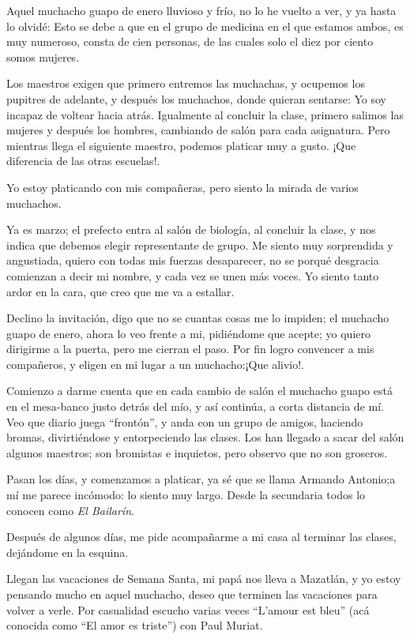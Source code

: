 \documentclass[letterpaper, 12pt]{book}
\begin{document}
Aquel muchacho guapo de enero lluvioso y frío, no lo he vuelto a ver, y ya hasta lo olvidé: Esto se debe a que en el grupo de medicina en el que estamos ambos, es muy numeroso, consta de cien personas, de las cuales solo el diez por ciento somos mujeres.

Los maestros exigen que primero entremos las muchachas, y ocupemos los pupitres de adelante, y después los muchachos, donde quieran sentarse: Yo soy incapaz de voltear hacia atrás. Igualmente al concluir la clase, primero salimos las mujeres y después los hombres, cambiando de salón para cada asignatura. Pero mientras llega el siguiente maestro, podemos platicar muy a gusto. ¡Que diferencia de las otras escuelas!. 

Yo estoy platicando con mis compañeras, pero siento la mirada de varios muchachos.

Ya es marzo; el prefecto entra al salón de biología, al concluir la clase, y nos indica que debemos elegir representante de grupo. Me siento muy sorprendida y angustiada, quiero con todas mis fuerzas desaparecer, no se porqué desgracia comienzan a decir mi nombre, y cada vez se unen más voces. Yo siento tanto ardor en la cara, que creo que me va a estallar.

Declino la invitación, digo que no se cuantas cosas me lo impiden; el muchacho guapo de enero, ahora lo veo frente a mi, pidiéndome que acepte; yo quiero dirigirme a la puerta, pero me cierran el paso. Por fin logro convencer a mis compañeros, y eligen en mi lugar a un muchacho:¡Que alivio!.

Comienzo a darme cuenta que en cada cambio de salón el muchacho guapo está en el mesa-banco justo detrás del mío, y así continúa, a corta distancia de mí. Veo que diario juega ``frontón'', y anda con un grupo de amigos, haciendo bromas, divirtiéndose y entorpeciendo las clases. Los han llegado a sacar del salón algunos maestros; son bromistas e inquietos, pero observo que no son groseros.

Pasan los días, y comenzamos a platicar, ya sé que se llama Armando Antonio;a mí me parece incómodo: lo siento muy largo. Desde la secundaria todos lo conocen como \textit{El Bailarín}.

Después de algunos días, me pide acompañarme a mi casa al terminar las clases, dejándome en la esquina. 

Llegan las vacaciones de Semana Santa, mi papá nos lleva a Mazatlán, y yo estoy pensando mucho en aquel muchacho, deseo que terminen las vacaciones para volver a verle. Por casualidad escucho varias veces ``L'amour est bleu'' (acá conocida como ``El amor es triste'') con Paul Muriat. 
\end{document}
